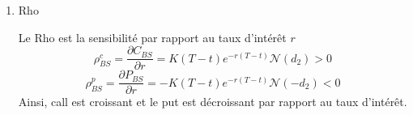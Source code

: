 \documentclass{article}
\theoremstyle{plain}
\theoremstyle{definition}
\begin{document}
\begin{enumerate}
\item Rho

Le Rho est la sensibilit\'e par rapport au taux d'int\'er\^et $r$
\begin{equation}
\rho_{BS}^c=\frac{\partial C_{BS}}{\partial r}=K(T-t)e^{-r(T-t)}\mathcal{N}(d_2)>0
\end{equation}
\begin{equation}
\rho_{BS}^p=\frac{\partial P_{BS}}{\partial r}=-K(T-t)e^{-r(T-t)}\mathcal{N}(-d_2)<0
\end{equation}
Ainsi, call est croissant et le put est d\'ecroissant par rapport au taux d'int\'er\^et.

\end{enumerate}
\end{document}
